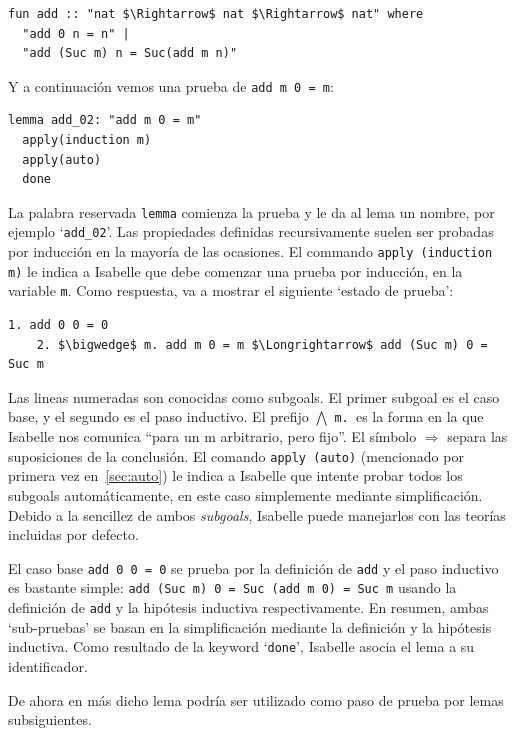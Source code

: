 \documentclass[12pt]{book}
\begin{document}
\begin{lstlisting}[style=Isabelle]
  fun add :: "nat $\Rightarrow$ nat $\Rightarrow$ nat" where
  "add 0 n = n" |
  "add (Suc m) n = Suc(add m n)"
\end{lstlisting}

Y a continuación vemos una prueba de \texttt{add m 0 = m}:
\begin{lstlisting}[style=Isabelle]
  lemma add_02: "add m 0 = m"
  apply(induction m)
  apply(auto)	  
  done
\end{lstlisting}

La palabra reservada \texttt{lemma} comienza la prueba y le da al lema un nombre, por ejemplo `\texttt{add\_02}'. Las propiedades definidas recursivamente suelen ser probadas por inducción en la mayoría de las ocasiones. El commando \texttt{apply (induction m)} le indica a Isabelle que debe comenzar una prueba por inducción, en la variable \texttt{m}. Como respuesta, va a mostrar el siguiente `estado de prueba':

\begin{lstlisting}[style=Isabelle]
	1. add 0 0 = 0
	2. $\bigwedge$ m. add m 0 = m $\Longrightarrow$ add (Suc m) 0 = Suc m	
\end{lstlisting}

Las lineas numeradas son conocidas como subgoals. El primer subgoal es el caso base, y el segundo es el paso inductivo. El prefijo $\bigwedge$ \texttt{m. }es la forma en la que Isabelle nos comunica ``para un m arbitrario, pero fijo''. El símbolo $\Longrightarrow$ separa las suposiciones de la conclusión. El comando \texttt{apply (auto)} (mencionado por primera vez en~\ref{sec:auto}) le indica a Isabelle que intente probar todos los subgoals automáticamente, en este caso simplemente mediante simplificación. Debido a la sencillez de ambos \textit{subgoals}, Isabelle puede manejarlos con las teorías incluidas por defecto. 

El caso base \texttt{add 0 0 = 0} se prueba por la definición de \texttt{add} y el paso inductivo es bastante simple: \texttt{add (Suc m) 0 = Suc (add m 0) = Suc m} usando la definición de \texttt{add} y la hipótesis inductiva respectivamente. En resumen, ambas `sub-pruebas' se basan en la simplificación mediante la definición y la hipótesis inductiva. Como resultado de la keyword `\texttt{done}', Isabelle asocia el lema a su identificador.

De ahora en más dicho lema podría ser utilizado como paso de prueba por lemas subsiguientes.
\end{document}
